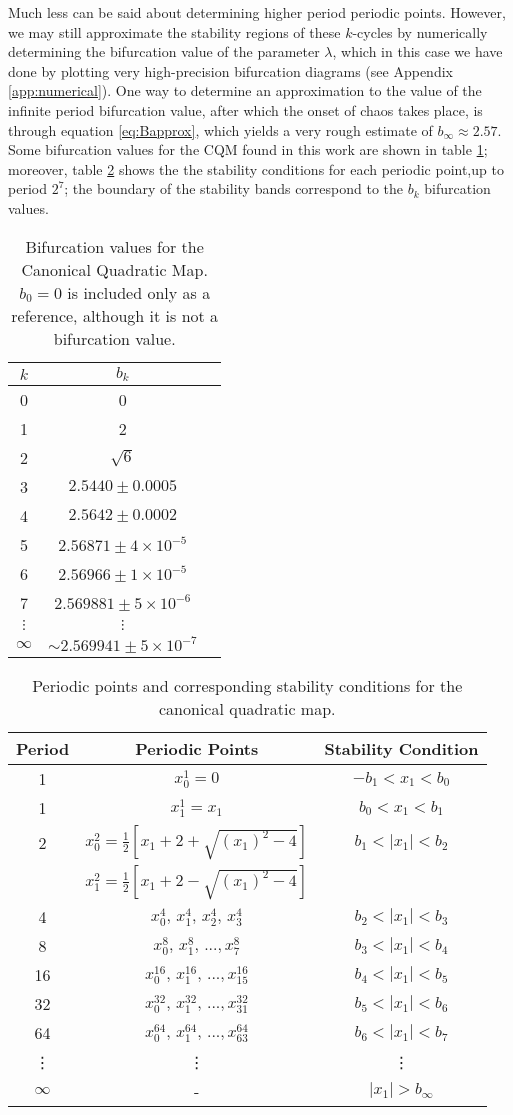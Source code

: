 \documentclass[10pt,twoside,titlepage]{book}
\numberwithin{equation}{chapter}
\numberwithin{figure}{chapter}
\numberwithin{table}{chapter}
\theoremstyle{plain}%
\theoremstyle{definition}
\theoremstyle{remark}
\begin{document}
Much less can be said about determining higher period periodic points. However, we may still approximate the stability regions of these $k$-cycles by numerically determining the bifurcation value of the parameter $\lambda$, which in this case we have done by plotting very high-precision bifurcation diagrams (see Appendix \ref{app:numerical}). One way to determine an approximation to the value of the infinite period bifurcation value, after which the onset of chaos takes place, is through equation \eqref{eq:Bapprox}, which yields a very rough estimate of $b_{\infty}\approx2.57$. Some bifurcation values for the CQM found in this work are shown in table \ref{tab:CQM-BifurcationValues}; moreover, table \ref{tab:CQM-StabilityConditions} shows the the stability conditions for each periodic point,up to period $2^7$; the boundary of the stability bands correspond to the $b_k$ bifurcation values.

\begin{table}
	\begin{tabular}[]{|c|c|c|}
		\hline
		$k$ & $b_k$ \tabularnewline
		\hline
		0 & 0 \tabularnewline
		\hline
		1 & 2 \tabularnewline
		\hline
		2 & $\sqrt{6}$\tabularnewline
		\hline
		3 & $2.5440\pm0.0005$\tabularnewline
		\hline
		4 & $2.5642\pm0.0002$\tabularnewline
		\hline
		5 & $2.56871\pm4\times10^{-5}$\tabularnewline
		\hline
		6 & $2.56966\pm1\times10^{-5}$\tabularnewline
		\hline
		7 & $2.569881\pm5\times10^{-6}$\tabularnewline
		\hline
		$\vdots$ & $\vdots$\tabularnewline
		\hline
		$\infty$ & $\sim2.569941\pm5\times10^{-7}$\tabularnewline
		\hline
	\end{tabular}
	\caption{Bifurcation values for the Canonical Quadratic Map. $b_0=0$ is included only as a reference, although it is not a bifurcation value.}
	\label{tab:CQM-BifurcationValues}
\end{table}

\begin{table}
	\begin{tabular}[]{|c|c|c|}
		\hline
		Period & Periodic Points & Stability Condition \tabularnewline
		\hline
		1 & $x_0^1=0$ & $-b_1< x_1 <b_0$ \tabularnewline
		\hline
		1 & $x_1^1=x_1$ & $b_0<x_1<b_1$ \tabularnewline
		\hline
		2 & $x_0^2=\frac{1}{2}\left[x_1+2+\sqrt{(x_1)^2-4}\right]$ & $b_1<\vert x_1\vert<b_2$ \tabularnewline
		& $x_1^2=\frac{1}{2}\left[x_1+2-\sqrt{(x_1)^2-4}\right]$ & \tabularnewline
		\hline
		4 & $x_0^4,\, x_1^4,\, x_2^4,\, x_3^4$ & $b_2<|x_1|<b_3$ \tabularnewline
		\hline
		8 & $x_0^8,\, x_1^8,\, ..., x_7^8$ & $b_3<|x_1|<b_4$ \tabularnewline
		\hline
		16 & $x_0^{16},\, x_1^{16},\, ..., x_{15}^{16}$ & $b_4<|x_1|<b_5$ \tabularnewline
		\hline
		32 & $x_0^{32},\, x_1^{32},\, ..., x_{31}^{32}$ & $b_5<|x_1|<b_6$ \tabularnewline
		\hline
		64 & $x_0^{64},\, x_1^{64},\, ..., x_{63}^{64}$ & $b_6<|x_1|<b_7$ \tabularnewline
		\hline
		\vdots & \vdots & \vdots \tabularnewline
		\hline
		$\infty$ & - & $\vert x_1\vert> b_{\infty}$ \tabularnewline
		\hline
	\end{tabular}
	\caption{Periodic points and corresponding stability conditions for the canonical quadratic map.}
	\label{tab:CQM-StabilityConditions}
\end{table}
\end{document}
